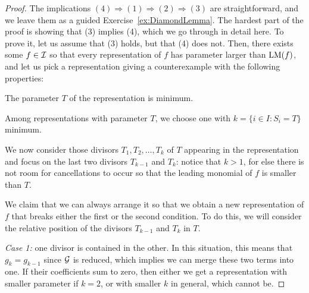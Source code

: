 \begin{proof}
The implications $(4)\Longrightarrow (1)\Longrightarrow (2)
\Longrightarrow (3)$ are straightforward, and we leave them
as a guided Exercise~\ref{ex:DiamondLemma}.
The hardest part of the proof is
showing that (3) implies (4), which we go through in
detail here. To prove it, let us assume that (3) holds, but
that (4) does not. Then, there exists some $f\in\mathcal{I}$
so that every representation of $f$ has parameter 
larger than $\operatorname{LM}(f)$, and let us pick a representation
giving a counterexample with the following properties:
\begin{tenumerate}
\item The parameter $T$ of the representation is minimum.
\item Among representations with parameter $T$, we choose one
with $k=\{ i\in I : S_i=T\}$ minimum.
\end{tenumerate}
We now consider those divisors $T_1,T_2,\ldots,T_k$
of $T$ appearing in the representation and focus on the last two
divisors $T_{k-1}$
and $T_k$: notice that $k>1$, for else there is not room for
cancellations to occur so that the leading monomial of $f$ is smaller than $T$. 

We claim that we can always arrange it so that
we obtain a new representation of $f$ that breaks either
the first or the second condition. To do this, we will consider
the relative position of the divisors $T_{k-1}$ and $T_k$
in $T$.

\emph{Case 1:} one divisor is contained in the other. In this
situation, this means that $g_k = g_{k-1}$ since $\mathcal G$ is
reduced, which implies we can merge these two terms into one.
If their coefficients sum to zero, then either we get a 
representation with smaller parameter if $k=2$, or with
smaller $k$ in general, which cannot be.


\end{proof}
